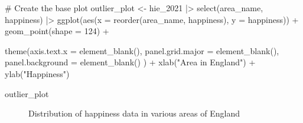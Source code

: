 \documentclass[
  letterpaper,
  DIV=11,
  numbers=noendperiod]{scrreprt}
\newenvironment{Shaded}{\begin{snugshade}}{\end{snugshade}}
\newcommand{\AttributeTok}[1]{\textcolor[rgb]{0.40,0.45,0.13}{#1}}
\newcommand{\CommentTok}[1]{\textcolor[rgb]{0.37,0.37,0.37}{#1}}
\newcommand{\DecValTok}[1]{\textcolor[rgb]{0.68,0.00,0.00}{#1}}
\newcommand{\FunctionTok}[1]{\textcolor[rgb]{0.28,0.35,0.67}{#1}}
\newcommand{\NormalTok}[1]{\textcolor[rgb]{0.00,0.23,0.31}{#1}}
\newcommand{\OtherTok}[1]{\textcolor[rgb]{0.00,0.23,0.31}{#1}}
\newcommand{\SpecialCharTok}[1]{\textcolor[rgb]{0.37,0.37,0.37}{#1}}
\newcommand{\StringTok}[1]{\textcolor[rgb]{0.13,0.47,0.30}{#1}}
\begin{document}
\begin{Shaded}
\begin{Highlighting}[]
\CommentTok{\# Create the base plot}
\NormalTok{outlier\_plot }\OtherTok{\textless{}{-}}
\NormalTok{  hie\_2021 }\SpecialCharTok{|\textgreater{}}
  \FunctionTok{select}\NormalTok{(area\_name, happiness) }\SpecialCharTok{|\textgreater{}}
  \FunctionTok{ggplot}\NormalTok{(}\FunctionTok{aes}\NormalTok{(}\AttributeTok{x =} \FunctionTok{reorder}\NormalTok{(area\_name, happiness),}
             \AttributeTok{y =}\NormalTok{ happiness)) }\SpecialCharTok{+}
  \FunctionTok{geom\_point}\NormalTok{(}\AttributeTok{shape =} \DecValTok{124}\NormalTok{) }\SpecialCharTok{+}
  
  \FunctionTok{theme}\NormalTok{(}\AttributeTok{axis.text.x =} \FunctionTok{element\_blank}\NormalTok{(),}
        \AttributeTok{panel.grid.major =} \FunctionTok{element\_blank}\NormalTok{(),}
        \AttributeTok{panel.background =} \FunctionTok{element\_blank}\NormalTok{()}
\NormalTok{  ) }\SpecialCharTok{+}
  \FunctionTok{xlab}\NormalTok{(}\StringTok{"Area in England"}\NormalTok{) }\SpecialCharTok{+}
  \FunctionTok{ylab}\NormalTok{(}\StringTok{"Happiness"}\NormalTok{)}

\NormalTok{outlier\_plot}
\end{Highlighting}
\end{Shaded}

\begin{figure}


\caption{\label{fig-deviation-plot-happiness}Distribution of happiness
data in various areas of England}

\end{figure}%
\end{document}
